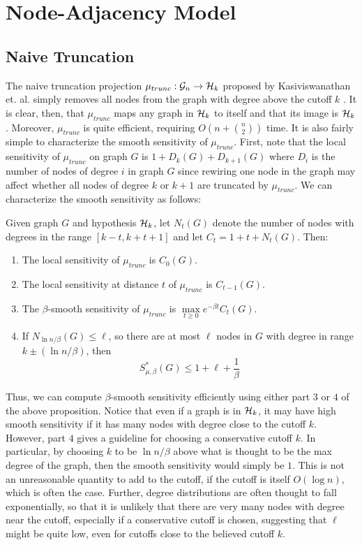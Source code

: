 \section{Node-Adjacency Model}

\subsection*{Naive Truncation}

The naive truncation projection $\mu_{trunc}: \mathcal{G}_n \to \mathcal{H}_{k}$ proposed by Kasiviswanathan et. al. simply removes all nodes from the graph with degree above the cutoff $k$ \cite{KNRS13}. It is clear, then, that $\mu_{trunc}$ maps any graph in $\mathcal{H}_k$ to itself and that its image is $\mathcal{H}_k$. Moreover, $\mu_{trunc}$ is quite efficient, requiring $O(n + \binom{n}{2})$ time. It is also fairly simple to characterize the smooth sensitivity of $\mu_{trunc}$. First, note that the local sensitivity of $\mu_{trunc}$ on graph $G$ is $1 + D_k(G) + D_{k+1}(G)$ where  $D_{i}$ is the number of nodes of degree $i$ in graph $G$ since rewiring one node in the graph may affect whether all nodes of degree $k$ or $k+1$ are truncated by $\mu_{trunc}$. We can characterize the smooth sensitivity as follows:

\begin{proposition}
Given graph $G$ and hypothesis $\mathcal{H}_k$, let $N_t(G)$ denote the number of nodes with degrees in the range $[k - t, k+ t+ 1]$ and let $C_t = 1 + t+ N_t(G)$. Then:
\begin{enumerate}
	\item The local sensitivity of $\mu_{trunc}$ is $C_0(G)$.
	\item The local sensitivity at distance $t$ of $\mu_{trunc}$ is $C_{t-1}(G)$. 
	\item The $\beta$-smooth sensitivity of $\mu_{trunc}$ is $\max\limits_{t \geq 0} e^{-\beta t} C_{t}(G)$.
	\item If $N_{\ln n/\beta} (G) \leq \ell$, so there are at most $\ell$ nodes in $G$ with degree in range $k \pm (\ln n/\beta)$, then 
	$$S^*_{\mu, \beta}(G) \leq 1 + \ell + \frac{1}{\beta}$$
\end{enumerate}

Thus, we can compute $\beta$-smooth sensitivity efficiently using either part $3$ or $4$ of the above proposition. Notice that even if a graph is in $\mathcal{H}_k$, it may have high smooth sensitivity if it has many nodes with degree close to the cutoff $k$. However, part $4$ gives a guideline for choosing a conservative cutoff $k$. In particular, by choosing $k$ to be $\ln n  / \beta$ above what is thought to be the max degree of the graph, then the smooth sensitivity would simply be $1$. This is not an unreasonable quantity to add to the cutoff, if the cutoff is itself $O(\log n)$, which is often the case. Further, degree distributions are often thought to fall exponentially, so that it is unlikely that there are very many nodes with degree near the cutoff, especially if a conservative cutoff is chosen, suggesting that $\ell$ might be quite low, even for cutoffs close to the believed cutoff $k$.

\end{proposition}


